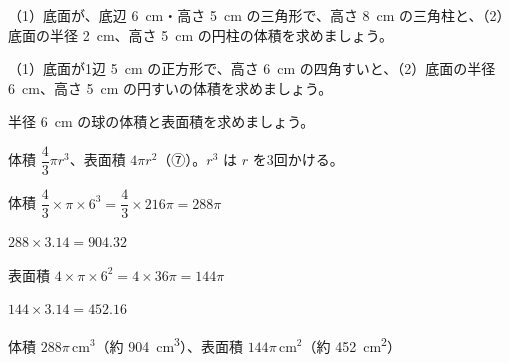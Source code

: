 \noindent\begin{minipage}[t]{0.485\linewidth}\vspace{0pt}\raggedright
\begin{jibun}\raggedright
（1）底面が、底辺 \qty{6}{cm}・高さ \qty{5}{cm} の三角形で、高さ \qty{8}{cm} の三角柱と、（2）底面の半径 \qty{2}{cm}、高さ \qty{5}{cm} の円柱の体積を求めましょう。
\end{jibun}
\end{minipage}\hfill
\begin{minipage}[t]{0.485\linewidth}\vspace{0pt}\raggedright
\begin{jibun}\raggedright
（1）底面が1辺 \qty{5}{cm} の正方形で、高さ \qty{6}{cm} の四角すいと、（2）底面の半径 \qty{6}{cm}、高さ \qty{5}{cm} の円すいの体積を求めましょう。
\end{jibun}
\end{minipage}

\begin{reidai}[球の体積と表面積]
半径 \qty{6}{cm} の球の体積と表面積を求めましょう。\par
\kangaekata 体積 $\dfrac{4}{3}\pi r^3$、表面積 $4\pi r^2$（⑦）。$r^3$ は $r$ を3回かける。\par
\shiki 体積 $\dfrac{4}{3}\times\pi\times6^3=\dfrac{4}{3}\times216\pi=288\pi$\par
\hspace*{4.6\zw}$288\times3.14=904.32$\par
\hspace*{2.6\zw}表面積 $4\times\pi\times6^2=4\times36\pi=144\pi$\par
\hspace*{4.6\zw}$144\times3.14=452.16$\par
\kotae 体積 $288\pi$\,cm$^3$（約 \qty{904}{cm^3}）、表面積 $144\pi$\,cm$^2$（約 \qty{452}{cm^2}）
\end{reidai}

